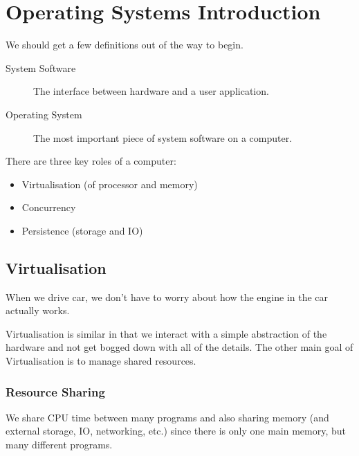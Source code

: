 \section{Operating Systems Introduction}\label{sec:operating_systems_introduction}
\begin{note}
	We should get a few definitions out of the way to begin.
	\begin{description}
		\item[System Software] The interface between hardware and a user application.
		\item[Operating System] The most important piece of system software on a computer.
	\end{description}
\end{note}
\noindent
There are three key roles of a computer:
\begin{itemize}
	\item Virtualisation (of processor and memory)
	\item Concurrency
	\item Persistence (storage and IO)
\end{itemize}

\subsection{Virtualisation}\label{sub:virtualisation}

When we drive car, we don't have to worry about how the engine in the car actually works.

Virtualisation is similar in that we interact with a simple abstraction of the hardware and not get bogged down with all of the details.
The other main goal of Virtualisation is to manage shared resources.

\subsubsection{Resource Sharing}\label{ssub:resource_sharing}

We share CPU time between many programs and also sharing memory (and external storage, IO, networking, etc.) since there is only one main memory, but many different programs.

